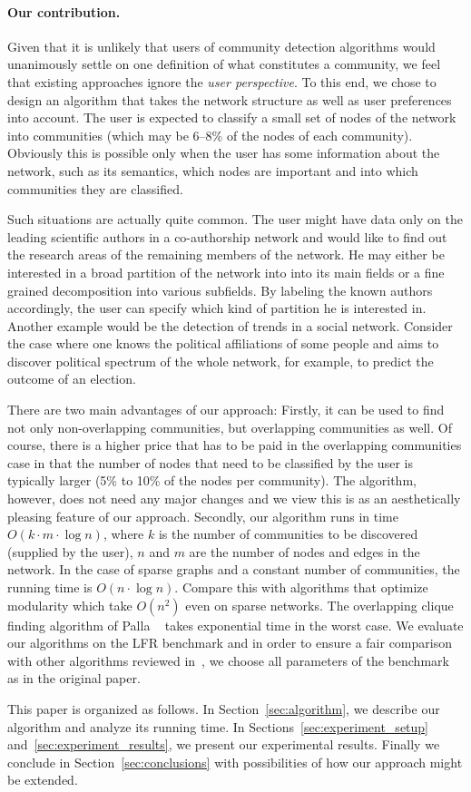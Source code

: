 \paragraph{Our contribution.}
Given that it is unlikely that users of community detection algorithms 
would unanimously settle on one definition of what constitutes a community, 
we feel that existing approaches ignore the \emph{user perspective}.
To this end, we chose to design an algorithm that takes the network structure 
as well as user preferences into account. 
The user is expected to classify a small set of nodes of the network 
into communities (which may be 6--8\% of the nodes of each community).
Obviously this is possible only when the user has some 
information about the network, such as its semantics, which nodes 
are important and into which communities they are classified. 

Such situations are actually quite common. The user might have data only on the
leading scientific authors in a co-authorship network and would like to find out
the research areas of the remaining members of the network.  He may either be
interested in a broad partition of the network into into its main fields or a
fine grained decomposition into various subfields.  By labeling the known
authors accordingly, the user can specify which kind of partition he is
interested in.  Another example would be the detection of trends in a social
network.  Consider the case where one knows the political affiliations of some
people and aims to discover political spectrum of the whole network, for
example, to predict the outcome of an election. 

There are two main advantages of our approach: Firstly, it can be used to find
not only non-overlapping communities, but overlapping communities as well. Of
course, there is a higher price that has to be paid in the overlapping
communities case in that the number of nodes that need to be classified by the
user is typically larger (5\% to 10\% of the nodes per community). The
algorithm, however, does not need any major changes and we view this is as an
aesthetically pleasing feature of our approach.  Secondly, our algorithm runs in
time $O(k \cdot m \cdot \log n)$, where $k$ is the number of communities to be
discovered (supplied by the user), $n$ and $m$ are the number of nodes and edges
in the network. In the case of sparse graphs and a constant number of
communities, the running time is $O(n \cdot \log n)$.  Compare this with
algorithms that optimize modularity which take $O(n^2)$ even on sparse
networks. The overlapping clique finding algorithm of Palla \etal~\cite{PDFV05}
takes exponential time in the worst case. We evaluate our algorithms on the LFR
benchmark and in order to ensure a fair comparison with other algorithms
reviewed in~\cite{LF09}, we choose all parameters of the benchmark as in the
original paper.

This paper is organized as follows. In Section~\ref{sec:algorithm}, we 
describe our algorithm and analyze its running time. In Sections~\ref{sec:experiment_setup} 
and~\ref{sec:experiment_results}, we present our experimental results. Finally we conclude 
in Section~\ref{sec:conclusions} with possibilities of how our approach might be extended. 




